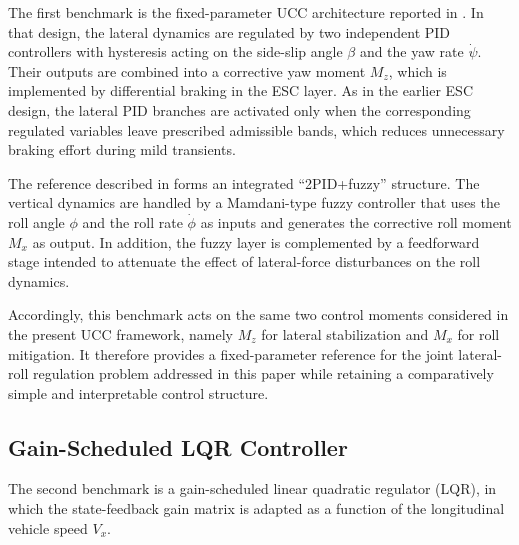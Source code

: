 \documentclass[sn-chicago,iicol]{sn-jnl}
\theoremstyle{thmstyleone}%
\theoremstyle{thmstyletwo}%
\theoremstyle{thmstylethree}%
\begin{document}
The first benchmark is the fixed-parameter UCC architecture reported in 
\citep{arronte2024controle}. In that design, the lateral dynamics are 
regulated by two independent PID controllers with hysteresis acting on 
the side-slip angle $\beta$ and the yaw rate $\dot{\psi}$. Their outputs 
are combined into a corrective yaw moment $M_z$, which is implemented by 
differential braking in the ESC layer. As in the earlier ESC design, the 
lateral PID branches are activated only when the corresponding regulated 
variables leave prescribed admissible bands, which reduces unnecessary 
braking effort during mild transients.

The reference described in \citep{arronte2024controle} forms an 
integrated ``2PID+fuzzy'' structure. The vertical dynamics are handled 
by a Mamdani-type fuzzy controller that uses the roll angle $\phi$ and 
the roll rate $\dot{\phi}$ as inputs and generates the corrective roll 
moment $M_x$ as output. In addition, the fuzzy layer is complemented by 
a feedforward stage intended to attenuate the effect of lateral-force 
disturbances on the roll dynamics.

Accordingly, this benchmark acts on the same two control moments 
considered in the present UCC framework, namely $M_z$ for lateral 
stabilization and $M_x$ for roll mitigation. It therefore provides a 
fixed-parameter reference for the joint lateral-roll regulation problem 
addressed in this paper while retaining a comparatively simple and 
interpretable control structure.

\subsection{Gain-Scheduled LQR Controller}\label{sec:gslqr}

The second benchmark is a gain-scheduled linear quadratic regulator 
(LQR), in which the state-feedback gain matrix is adapted as a function 
of the longitudinal vehicle speed $V_x$.
\end{document}
